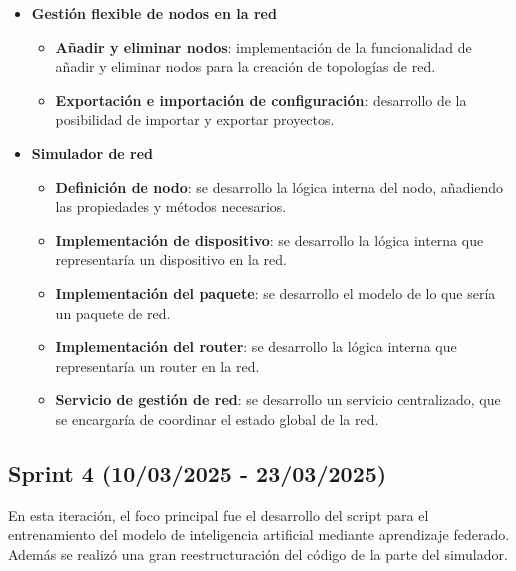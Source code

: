 \begin{itemize}
    \item \textbf{Gestión flexible de nodos en la red}
    \begin{itemize}
        \item \textbf{Añadir y eliminar nodos}: implementación de la funcionalidad de añadir y eliminar nodos para la creación de topologías de red.
        \item \textbf{Exportación e importación de configuración}: desarrollo de la posibilidad de importar y exportar proyectos.
    \end{itemize}
    \item \textbf{Simulador de red}
    \begin{itemize}
        \item \textbf{Definición de nodo}: se desarrollo la lógica interna del nodo, añadiendo las propiedades y métodos necesarios.
        \item \textbf{Implementación de dispositivo}: se desarrollo la lógica interna que representaría un dispositivo en la red.
        \item \textbf{Implementación del paquete}: se desarrollo el modelo de lo que sería un paquete de red.
        \item \textbf{Implementación del router}: se desarrollo la lógica interna que representaría un router en la red.
        \item \textbf{Servicio de gestión de red}: se desarrollo un servicio centralizado, que se encargaría de coordinar el estado global de la red.
    \end{itemize}
\end{itemize}

\subsection{Sprint 4 (10/03/2025 - 23/03/2025)}
\label{subsec:CuartoSprint}
En esta iteración, el foco principal fue el desarrollo del script para el entrenamiento del modelo de inteligencia artificial mediante aprendizaje federado. Además se realizó una gran reestructuración del código de la parte del simulador. 

